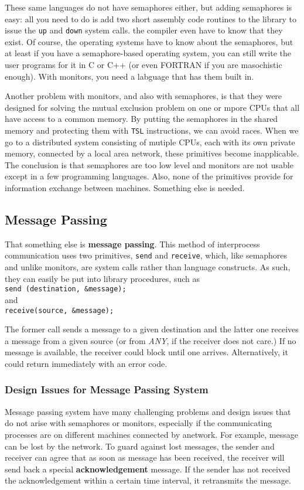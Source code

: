 \documentclass{book}
\newcommand {\kw}  [1] {\textbf{#1}}
\newcommand {\sys} [1] {\textsl{#1}}
\newcommand {\cmd} [1] {\texttt{#1}}
\begin{document}
These same languages do not have semaphores either, but adding semaphores is easy:
all you need to do is add two short assembly code routines to the library to issue the \cmd{up} and \cmd{down} system calls.
the compiler even have to know that they exist.
Of course, the operating systems have to know about the semaphores, 
but at least if you have a semaphore-based operating system,
you can still write the user programs for it in C or C++ (or even FORTRAN if you are masochistic enough).
With monitors, you need a labguage that has them built in.

Another problem with monitors, and also with semaphores, 
is that they were designed for solving the mutual exclusion problem on one or mpore CPUs that all have access to a common memory.
By putting the semaphores in the shared memory and protecting them with \cmd{TSL} instructions,
we can avoid races.
When we go to a distributed system consisting of mutiple CPUs, 
each with its own private memory, connected by a local area network, these primitives become inapplicable.
The conclusion is that semaphores are too low level and monitors are not usable except in a few programming languages.
Also, none of the primitives provide for information exchange between machines.
Something else is needed.

\subsection{Message Passing}
That something else is \kw{message passing}.
This method of interprocess communication uses two primitives, \cmd{send} and \cmd{receive},
which, like semaphores and unlike monitors, are system calls rather than language constructs.
As such, they can easily be put into library procedures, such as\\
\cmd{send (destination, \&message);}\\
and\\
\cmd{receive(source, \&message);}

The former call sends a message to a given destination and the latter one receives a message from a given source
(or from \sys{ANY}, if the receiver does not care.)
If no message is available, the receiver could block until one arrives.
Alternatively, it could return immediately with an error code.

\subsubsection*{Design Issues for Message Passing System}
Message passing system have many challenging problems and design issues that do not arise with semaphores or monitors,
especially if the communicating processes are on different machines connected by anetwork.
For example, message can be lost by the network.
To guard against lost messages, the sender and receiver can agree that as soon as message has been received, 
the receiver will send back a special \kw{acknowledgement} message.
If the sender has not received the acknowledgement within a certain time interval, it retransmits the message.
\end{document}
